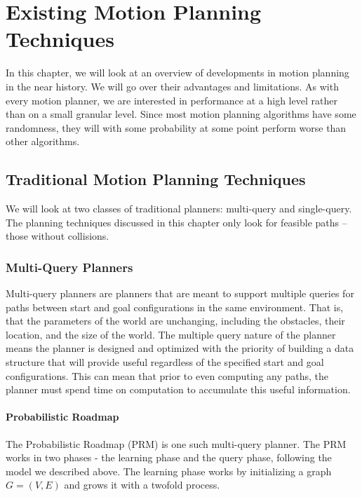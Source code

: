 \chapter{Existing Motion Planning Techniques}
In this chapter, we will look at an overview of developments in motion planning in the near history. We will go over their advantages and limitations. As with every motion planner, we are interested in performance at a high level rather than on a small granular level. Since most motion planning algorithms have some randomness, they will with some probability at some point perform worse than other algorithms. 

\section{Traditional Motion Planning Techniques} \label{planning:techniques}
We will look at two classes of traditional planners: multi-query and single-query. The planning techniques discussed in this chapter only look for feasible paths -- those without collisions.

\subsection{Multi-Query Planners}
Multi-query planners are planners that are meant to support multiple queries for paths between start and goal configurations in the same environment. That is, that the parameters of the world are unchanging, including the obstacles, their location, and the size of the world. The multiple query nature of the planner means the planner is designed and optimized with the priority of building a data structure that will provide useful regardless of the specified start and goal configurations. This can mean that prior to even computing any paths, the planner must spend time on computation to accumulate this useful information.

\subsubsection{Probabilistic Roadmap}
The Probabilistic Roadmap (PRM) is one such multi-query planner. The PRM works in two phases - the learning phase and the query phase, following the model we described above. The learning phase works by initializing a graph $G=(V,E)$ and grows it with a twofold process. 

